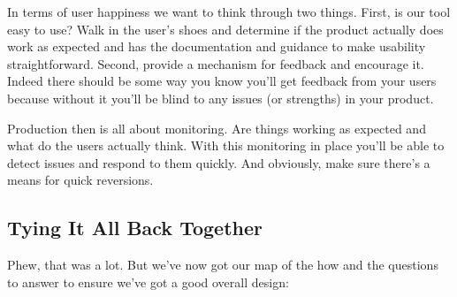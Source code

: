 \documentclass[10pt,a5paper]{book}
\begin{document}
In terms of user happiness we want to think through two things. First, is our tool easy to use? Walk in the user's shoes and determine if the product actually does work as expected and has the documentation and guidance to make usability straightforward. Second, provide a mechanism for feedback and encourage it. Indeed there should be some way you know you'll get feedback from your users because without it you'll be blind to any issues (or strengths) in your product. 

Production then is all about monitoring. Are things working as expected and what do the users actually think. With this monitoring in place you'll be able to detect issues and respond to them quickly. And obviously, make sure there's a means for quick reversions. 

\subsection{Tying It All Back Together}
Phew, that was a lot. But we've now got our map of the how and the questions to answer to ensure we've got a good overall design:
\end{document}
